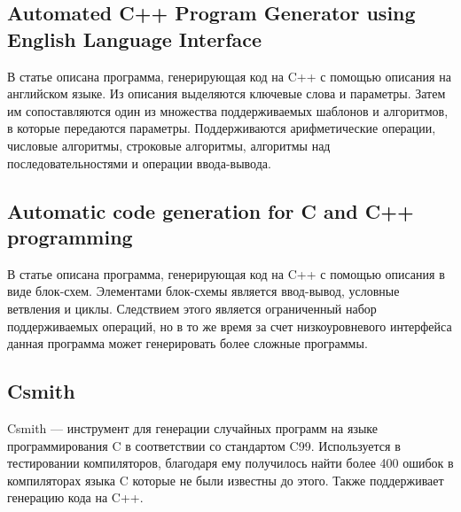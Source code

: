 


\subsection{Automated C++ Program Generator using English Language Interface}

В статье \cite{pg-eli} описана программа, генерирующая код на C++ с помощью описания на английском языке.
Из описания выделяются ключевые слова и параметры.
Затем им сопоставляются один из множества поддерживаемых шаблонов и алгоритмов, в которые передаются параметры.
Поддерживаются арифметические операции, числовые алгоритмы, строковые алгоритмы, алгоритмы над последовательностями и операции ввода-вывода.

 
\subsection{Automatic code generation for C and C++ programming}

В статье \cite{acg-2021} описана программа, генерирующая код на C++ с помощью описания в виде блок-схем.
Элементами блок-схемы является ввод-вывод, условные ветвления и циклы.
Следствием этого является ограниченный набор поддерживаемых операций,
но в то же время за счет низкоуровневого интерфейса данная программа может генерировать более сложные программы.

\subsection{Csmith}

Csmith --- инструмент для генерации случайных программ на языке программирования C в соответствии со стандартом C99.
Используется в тестировании компиляторов, благодаря ему получилось найти более 400 ошибок в компиляторах языка C которые не были известны до этого.
Также поддерживает генерацию кода на C++. \cite{csmith}
% 



